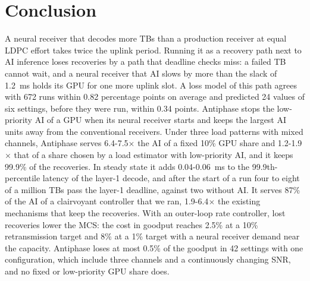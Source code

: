 \documentclass[acmsmall,screen,review,anonymous]{acmart}
\newcommand{\sys}{Antiphase\xspace}
\begin{document}
\section{Conclusion}

A neural receiver that decodes more TBs than a production receiver at equal LDPC effort takes twice the
uplink period. Running it as a recovery path next to AI inference loses recoveries by a path that deadline
checks miss: a failed TB cannot wait, and a neural receiver that AI slows by more than the slack of 1.2~ms
holds its GPU for one more uplink slot. A loss model of this path agrees with 672 runs within 0.82
percentage points on average and predicted 24 values of six settings, before they were run, within 0.34 points. \sys stops the low-priority AI of a GPU when its neural receiver starts and
keeps the largest AI units away from the conventional receivers. Under three load patterns with mixed
channels, \sys serves 6.4-7.5$\times$ the AI of a fixed 10\% GPU share and 1.2-1.9$\times$ that of a share
chosen by a load estimator with low-priority AI, and it keeps 99.9\% of the recoveries. In steady state it
adds 0.04-0.06~ms to the 99.9th-percentile latency of the layer-1 decode, and after the start of a run
four to eight of a million TBs pass the layer-1 deadline, against two without AI. It serves 87\% of
the AI of a clairvoyant controller that we ran, 1.9-6.4$\times$ the existing
mechanisms that keep the recoveries. With an outer-loop
rate controller, lost recoveries lower the MCS: the cost in goodput reaches 2.5\% at a 10\% retransmission
target and 8\% at a 1\% target with a neural receiver demand near the capacity. \sys loses at most 0.5\% of
the goodput in 42 settings with one configuration, which include three channels and a continuously changing
SNR, and no fixed or low-priority GPU share does.



\end{document}
